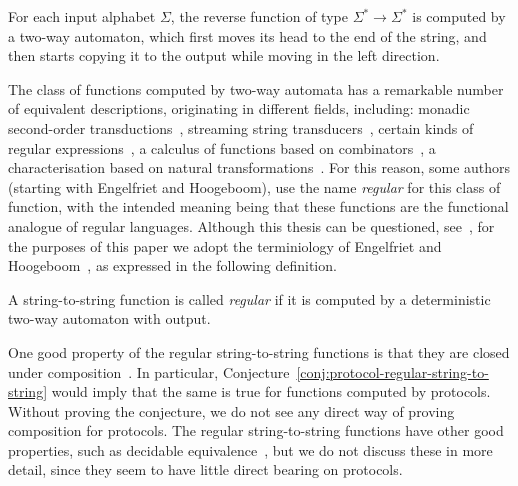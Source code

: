     \begin{myexample}[Reverse]
        For each input alphabet $\Sigma$, the reverse function of type $\Sigma^* \to \Sigma^*$ is computed by a  two-way automaton, which first moves its head to the end of the string, and then starts copying it to the output while moving in the left direction.
    \end{myexample}

    The class of functions computed by two-way automata has a remarkable number of equivalent descriptions,  originating in different fields, including:  monadic second-order transductions~\cite[Section 4]{engelfrietMSODefinableString2001}, streaming string transducers~\cite[Section 3]{alurExpressivenessStreamingString2010},  certain kinds of regular expressions~\cite[Section 2]{alur2014regular}, a calculus of functions based on  combinators~\cite[Theorem 6.1]{bojanczykRegularFirstOrderList2018}, a characterisation based on natural transformations~\cite[Theorem 3.2]{bojanczykTitoRegular23}. For this reason, some authors (starting with Engelfriet and Hoogeboom), use the name \emph{regular} for this class of function, with the intended meaning being that these functions are the functional analogue of regular languages. Although this thesis can be questioned, see~\cite{polyregular-survey}, for the purposes of this paper we adopt the terminiology of Engelfriet and Hoogeboom~\cite[p.~217]{engelfrietMSODefinableString2001}, as expressed in the following definition.


    \begin{definition}
        \label{def:regular-string-to-string}
        A string-to-string function is called \emph{regular} if it is computed by a deterministic two-way automaton with output.
    \end{definition}
    
    
    One good  property of the regular string-to-string functions is that they  are closed under composition~\cite[Theorem 2]{chytilSerialComposition2Way1977}. In particular, Conjecture~\ref{conj:protocol-regular-string-to-string} would imply that the same is true for functions computed by protocols. Without proving the conjecture, we do not see any direct way of proving composition for protocols. The  regular string-to-string functions have other good properties, such as decidable equivalence~\cite[Theorem 1]{gurariEquivalenceProblemDeterministic1982}, but we do not discuss these in more detail, since they seem to have little direct bearing on protocols.


